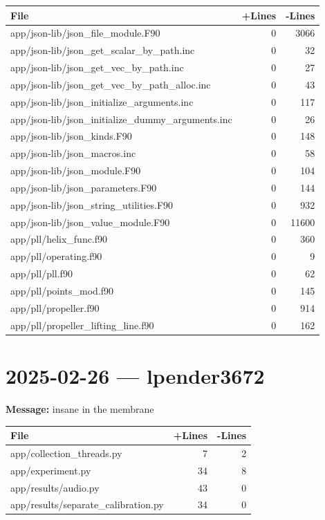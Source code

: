 \documentclass{article}
\begin{document}
\begin{longtable}{|p{10cm}|r|r|}
\hline \textbf{File} & \textbf{+Lines} & \textbf{-Lines} \\
\hline
app/json-lib/json\_file\_module.F90 & 0 & 3066 \\
\hline
app/json-lib/json\_get\_scalar\_by\_path.inc & 0 & 32 \\
\hline
app/json-lib/json\_get\_vec\_by\_path.inc & 0 & 27 \\
\hline
app/json-lib/json\_get\_vec\_by\_path\_alloc.inc & 0 & 43 \\
\hline
app/json-lib/json\_initialize\_arguments.inc & 0 & 117 \\
\hline
app/json-lib/json\_initialize\_dummy\_arguments.inc & 0 & 26 \\
\hline
app/json-lib/json\_kinds.F90 & 0 & 148 \\
\hline
app/json-lib/json\_macros.inc & 0 & 58 \\
\hline
app/json-lib/json\_module.F90 & 0 & 104 \\
\hline
app/json-lib/json\_parameters.F90 & 0 & 144 \\
\hline
app/json-lib/json\_string\_utilities.F90 & 0 & 932 \\
\hline
app/json-lib/json\_value\_module.F90 & 0 & 11600 \\
\hline
app/pll/helix\_func.f90 & 0 & 360 \\
\hline
app/pll/operating.f90 & 0 & 9 \\
\hline
app/pll/pll.f90 & 0 & 62 \\
\hline
app/pll/points\_mod.f90 & 0 & 145 \\
\hline
app/pll/propeller.f90 & 0 & 914 \\
\hline
app/pll/propeller\_lifting\_line.f90 & 0 & 162 \\
\hline
\end{longtable}

\section*{2025-02-26 --- lpender3672}
\textbf{Message:} insane in the membrane

\begin{longtable}{|p{10cm}|r|r|}
\hline \textbf{File} & \textbf{+Lines} & \textbf{-Lines} \\
\hline
app/collection\_threads.py & 7 & 2 \\
\hline
app/experiment.py & 34 & 8 \\
\hline
app/results/audio.py & 43 & 0 \\
\hline
app/results/separate\_calibration.py & 34 & 0 \\
\hline
\end{longtable}
\end{document}
